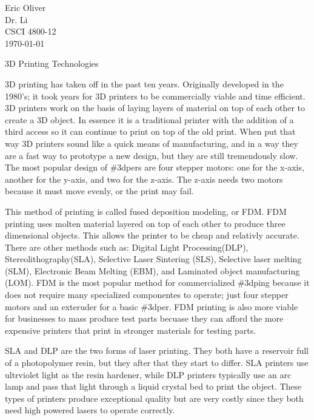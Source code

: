 \documentclass[12pt]{article}
\begin{document}
\begin{flushleft}

Eric Oliver \\
Dr. Li \\
CSCI 4800-12 \\
\today

\begin{center}
\large 3D Printing Technologies
\end{center}

\setlength{\parindent}{0.5in}



3D printing has taken off in the past ten years. Originally developed in the 1980's; it took years for 3D printers to be commercially viable and time efficient. 3D printers work on the basis of laying layers of material on top of each other to create a 3D object. In essence it is a traditional printer with the addition of a third access so it can continue to print on top of the old print. When put that way 3D printers sound like a quick means of manufacturing, and in a way they are a fast way to prototype a new design, but they are still tremendously slow. The most popular design of \#3dpers are four stepper motors: one for the x-axis, another for the y-axis, and two for the z-axis. The z-axis needs two motors because it must move evenly, or the print may fail. 

This method of printing is called fused deposition modeling, or FDM. FDM printing uses molten material layered on top of each other to produce three dimensional objects. This allows the printer to be cheap and relativly accurate. There are other methods such as: Digital Light Processing(DLP), Stereolithography(SLA), Selective Laser Sintering (SLS), Selective laser melting (SLM), Electronic Beam Melting (EBM), and Laminated object manufacturing (LOM). FDM is the most popular method for commercialized \#3dping because it does not require many specialized componentes to operate; just four stepper motors and an exteruder for a basic \#3dper. FDM printing is also more viable for businesses to mass produce test parts becuase they can afford the more expensive printers that print in stronger materials for testing parts.

SLA and DLP are the two forms of laser printing. They both have a reservoir full of a photopolymer resin, but they after that they start to differ. SLA printers use ultrviolet light as the resin hardener, while DLP printers typically use an arc lamp and pass that light through a liquid crystal bed to print the object. These types of printers produce exceptional quality but are very costly since they both need high powered lasers to operate correctly. 


\end{flushleft}
\end{document}
